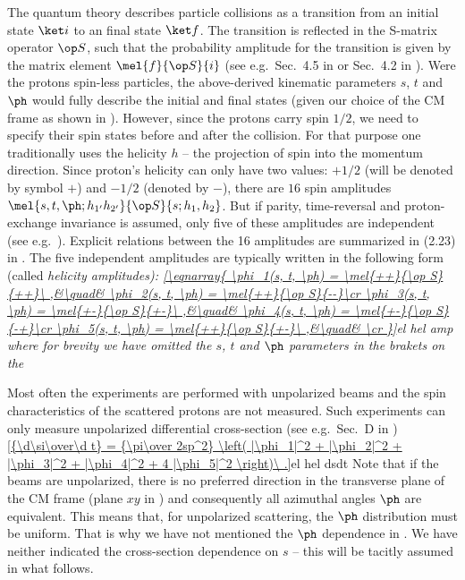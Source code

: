The quantum theory describes particle collisions as a transition from an initial state $\ket i$ to an final state $\ket f$. The transition is reflected in the S-matrix operator $\op S$, such that the probability amplitude for the transition is given by the matrix element $\mel{f}{\op S}{i}$ (see e.g.~Sec.~4.5 in  or Sec.~4.2 in ). Were the protons spin-less particles, the above-derived kinematic parameters $s$, $t$ and $\ph$ would fully describe the initial and final states (given our choice of the CM frame as shown in ). However, since the protons carry spin $1/2$, we need to specify their spin states before and after the collision. For that purpose one traditionally uses the helicity $h$ -- the projection of spin into the momentum direction. Since proton's helicity can only have two values: $+1/2$ (will be denoted by symbol $+$) and $-1/2$ (denoted by $-$), there are $16$ spin amplitudes $\mel{s, t, \ph; h_{1'} h_{2'}}{\op S}{s; h_1, h_2}$. But if parity, time-reversal and proton-exchange invariance is assumed, only five of these amplitudes are independent (see e.g.~). Explicit relations between the 16 amplitudes are summarized in (2.23) in . The five independent amplitudes are typically written in the following form (called \em{helicity amplitudes}):
\eqref{\eqnarray{
\phi_1(s, t, \ph) = \mel{++}{\op S}{++}\ ,&\quad& \phi_2(s, t, \ph) = \mel{++}{\op S}{--}\cr
\phi_3(s, t, \ph) = \mel{+-}{\op S}{+-}\ ,&\quad& \phi_4(s, t, \ph) = \mel{+-}{\op S}{-+}\cr
\phi_5(s, t, \ph) = \mel{++}{\op S}{+-}\ ,&\quad& \cr
}}{el hel amp}
where for brevity we have omitted the $s$, $t$ and $\ph$ parameters in the brakets on the \rhs

Most often the experiments are performed with unpolarized beams and the spin characteristics of the scattered protons are not measured. Such experiments can only measure unpolarized differential cross-section (see e.g.~Sec.~D in )
\eqref{{\d\si\over\d t} = {\pi\over 2sp^2} \left( |\phi_1|^2 + |\phi_2|^2 + |\phi_3|^2 + |\phi_4|^2 + 4 |\phi_5|^2 \right)\ .}{el hel dsdt}
Note that if the beams are unpolarized, there is no preferred direction in the transverse plane of the CM frame (plane $xy$ in ) and consequently all azimuthal angles $\ph$ are equivalent. This means that, for unpolarized scattering, the $\ph$ distribution must be uniform. That is why we have not mentioned the $\ph$ dependence in . We have neither indicated the cross-section dependence on $s$ -- this will be tacitly assumed in what follows.

